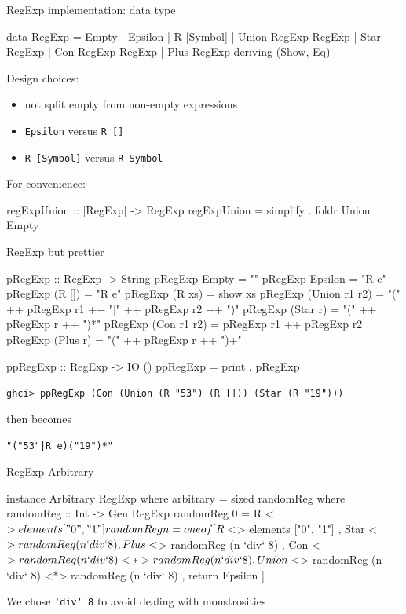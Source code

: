 \begin{frame}[fragile]{RegExp implementation: data type}
		\begin{code}
data RegExp = Empty | Epsilon | R [Symbol] | Union RegExp RegExp 
              | Star RegExp | Con RegExp RegExp | Plus RegExp 
  deriving (Show, Eq)
		\end{code}
	Design choices: \pause
	\begin{itemize}
\item not split empty from non-empty expressions	
\item \texttt{Epsilon} versus \texttt{R []}
\item \texttt{R [Symbol]} versus \texttt{R Symbol} 
	\end{itemize}
For convenience:
\begin{code}
regExpUnion :: [RegExp] -> RegExp
regExpUnion = simplify . foldr Union Empty
\end{code}		

\end{frame}
\begin{frame}[fragile]{RegExp but prettier}
	
\begin{code}
pRegExp :: RegExp -> String
pRegExp Empty = ""
pRegExp Epsilon = "R e"
pRegExp (R [])  = "R e" 
pRegExp (R xs) = show xs
pRegExp (Union r1 r2) = "(" ++ pRegExp r1 ++ "|" ++ pRegExp r2 ++ ")"
pRegExp (Star r) = "(" ++  pRegExp r ++ ")*"
pRegExp (Con r1 r2) = pRegExp r1 ++ pRegExp r2
pRegExp (Plus r) = "(" ++ pRegExp r ++ ")+"

ppRegExp :: RegExp -> IO ()
ppRegExp = print . pRegExp
\end{code}	

\texttt{ghci> ppRegExp (Con (Union (R "53") (R [])) (Star (R "19")))}

then becomes 

\texttt{"("53"|R e)("19")*"}
\end{frame}
\begin{frame}[fragile]{RegExp Arbitrary}
	\begin{code}
instance Arbitrary RegExp where
arbitrary = sized randomReg where
randomReg :: Int -> Gen RegExp
randomReg 0 = R <$> elements ["0", "1"]
randomReg n = oneof [ R <$> elements ["0", "1"]
, Star <$> randomReg (n `div` 8)
, Plus <$> randomReg (n `div` 8)
, Con <$> randomReg (n `div` 8)
<*> randomReg (n `div` 8) 
, Union <$> randomReg (n `div` 8)
<*> randomReg (n `div` 8)
, return Epsilon ]
	\end{code}
We chose \texttt{`div` 8} to avoid dealing with monstrosities	
\end{frame}
